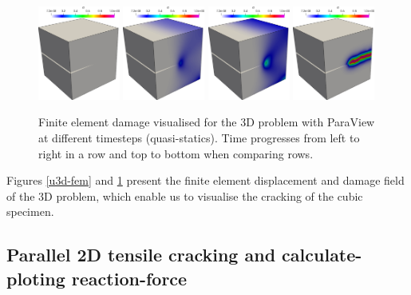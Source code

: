 \begin{figure}[h!]
	\centering
	
	\includegraphics[width=0.24\textwidth]{./Images/d3d0.png}
	\includegraphics[width=0.24\textwidth]{./Images/d3d1.png} 
	\includegraphics[width=0.24\textwidth]{./Images/d3d2.png}
	\includegraphics[width=0.24\textwidth]{./Images/d3d3.png}
	\caption{Finite element damage visualised for the 3D problem with ParaView at different timesteps (quasi-statics). Time progresses from left to right in a row and top to bottom when comparing rows. \label{d3d-fem}}
\end{figure}

Figures \ref{u3d-fem} and \ref{d3d-fem} present the finite element displacement and damage field of the 3D problem, which enable us to visualise the cracking of the cubic specimen.

\subsection{Parallel 2D tensile cracking and calculate-ploting reaction-force}

